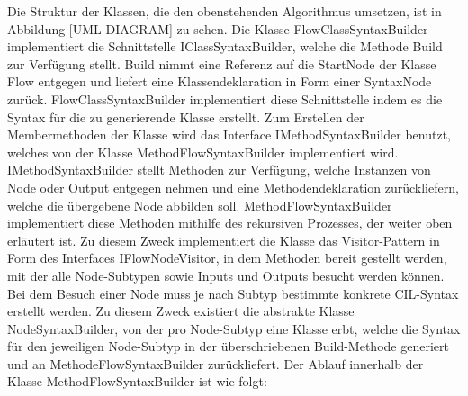 Die Struktur der Klassen, die den obenstehenden Algorithmus umsetzen, ist in Abbildung [UML DIAGRAM] zu sehen. Die Klasse FlowClassSyntaxBuilder implementiert die Schnittstelle IClassSyntaxBuilder, welche die Methode Build zur Verfügung stellt. Build nimmt eine Referenz auf die StartNode der Klasse Flow entgegen und liefert eine Klassendeklaration in Form einer SyntaxNode zurück. FlowClassSyntaxBuilder implementiert diese Schnittstelle indem es die Syntax für die zu generierende Klasse erstellt. Zum Erstellen der Membermethoden der Klasse wird das Interface IMethodSyntaxBuilder benutzt, welches von der Klasse MethodFlowSyntaxBuilder implementiert wird. IMethodSyntaxBuilder stellt Methoden zur Verfügung, welche Instanzen von Node oder Output entgegen nehmen und eine Methodendeklaration zurückliefern, welche die übergebene Node abbilden soll. MethodFlowSyntaxBuilder implementiert diese Methoden mithilfe des rekursiven Prozesses, der weiter oben erläutert ist. Zu diesem Zweck implementiert die Klasse das Visitor-Pattern in Form des Interfaces IFlowNodeVisitor, in dem Methoden bereit gestellt werden, mit der alle Node-Subtypen sowie Inputs und Outputs besucht werden können. Bei dem Besuch einer Node muss je nach Subtyp bestimmte konkrete CIL-Syntax erstellt werden. Zu diesem Zweck existiert die abstrakte Klasse NodeSyntaxBuilder, von der pro Node-Subtyp eine Klasse erbt, welche die Syntax für den jeweiligen Node-Subtyp in der überschriebenen Build-Methode generiert und an MethodeFlowSyntaxBuilder zurückliefert. Der Ablauf innerhalb der Klasse MethodFlowSyntaxBuilder ist wie folgt:
\newline
